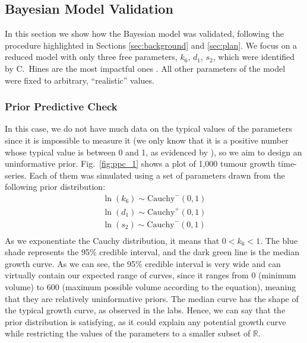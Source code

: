 \documentclass[11pt]{article}
\begin{document}
\subsection{Bayesian Model Validation}
In this section we show how the Bayesian model was validated, following the procedure highlighted in Sections \ref{sec:background} and \ref{sec:plan}. We focus on a reduced model with only three free parameters, $k_6$, $d_1$, $s_2$, which were identified by C.~Hines are the most impactful ones \cite{christian1}. All other parameters of the model were fixed to arbitrary, ``realistic'' values. 

\subsubsection{Prior Predictive Check}
In this case, we do not have much data on the typical values of the parameters since it is impossible to measure it (we only know that it is a positive number whose typical value is between 0 and 1, as evidenced by \cite{christian1}), so we aim to design an uninformative prior. Fig.~\ref{fig:ppc_1} shows a plot of 1,000 tumour growth time-series. Each of them was simulated using a set of parameters drawn from the following prior distribution:
\begin{align*}
    \ln(k_6) \sim \text{Cauchy}^-(0, 1) \\ 
    \ln(d_1) \sim \text{Cauchy}^+(0, 1) \\ 
    \ln(s_2) \sim \text{Cauchy}^-(0, 1) \\ 
\end{align*} 
As we exponentiate the Cauchy distribution, it means that $0 < k_6 < 1$. The blue shade represents the 95\% credible interval, and the dark green line is the median growth curve. As we can see, the 95\% credible interval is very wide and can virtually contain our expected range of curves, since it ranges from 0 (minimum volume) to 600 (maximum possible volume according to the equation), meaning that they are relatively uninformative priors. The median curve has the shape of the typical growth curve, as observed in the labs. Hence, we can say that the prior distribution is satisfying, as it could explain any potential growth curve while restricting the values of the parameters to a smaller subset of $\mathbb{R}$.
\end{document}
